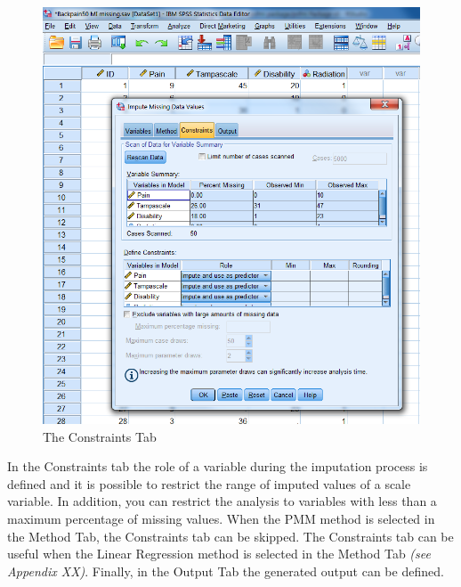 \documentclass[]{book}
\theoremstyle{definition}
\theoremstyle{definition}
\theoremstyle{definition}
\theoremstyle{remark}
\begin{document}
\begin{figure}

{\centering \includegraphics[width=0.9\linewidth]{images/fig4.8} 

}

\caption{The Constraints Tab}\label{fig:fig4-8}
\end{figure}

In the Constraints tab the role of a variable during the imputation
process is defined and it is possible to restrict the range of imputed
values of a scale variable. In addition, you can restrict the analysis
to variables with less than a maximum percentage of missing values. When
the PMM method is selected in the Method Tab, the Constraints tab can be
skipped. The Constraints tab can be useful when the Linear Regression
method is selected in the Method Tab \emph{(see Appendix XX)}. Finally,
in the Output Tab the generated output can be defined.
\end{document}
